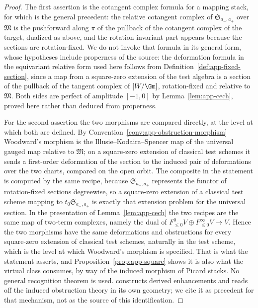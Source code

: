 \begin{proof}
The first assertion is the cotangent complex formula for a mapping stack, for
which \cite{ToenVezzosiHAGII} is the general precedent: the
relative cotangent complex of \(\mathfrak S_{a_-,a_+}\) over \(\mathfrak M\) is
the pushforward along \(\pi\) of the pullback of the cotangent complex of the
target, dualized as above, and the rotation-invariant part appears because the
sections are rotation-fixed.  We do not invoke that formula in its general
form, whose hypotheses include properness of the source: the deformation
formula in the equivariant relative form used here follows from
Definition~\ref{def:app-fixed-section}, since a map from a square-zero
extension of the test algebra is a section of the pullback of the tangent
complex of \([W/\Gm]\), rotation-fixed and relative to \(\mathfrak M\).
Both sides are perfect of amplitude
\([-1,0]\) by Lemma~\ref{lem:app-cech}, proved here rather than deduced from
properness.

For the second assertion the two morphisms are compared directly, at the level
at which both are defined.  By
Convention~\ref{conv:app-obstruction-morphism} Woodward's morphism is the
Illusie--Kodaira--Spencer map of the universal gauged map relative to
\(\mathfrak M\); on a square-zero extension of classical test schemes it sends
a first-order deformation of the section to the induced pair of deformations
over the two charts, compared on the open orbit.  The composite in the
statement is computed by the same recipe, because
\(\mathfrak S_{a_-,a_+}\) represents the functor of rotation-fixed sections
degreewise, so a square-zero extension of a classical test scheme mapping to
\(t_0\mathfrak S_{a_-,a_+}\) is exactly that extension problem for the
universal section.  In the presentation of Lemma~\ref{lem:app-cech} the two
recipes are the same map of two-term complexes, namely the dual of
\(F^0_{\leq0}V\oplus F^\infty_{\leq0}V\to V\).  Hence the two morphisms have
the same deformations and obstructions for every square-zero extension of
classical test schemes, naturally in the test scheme, which is the level at
which Woodward's morphism is specified.  That is what the statement asserts,
and Proposition~\ref{prop:app-square} shows it is also what the virtual class
consumes, by way of the induced morphism of Picard stacks.  No general
recognition theorem is used.  \cite{SchurgToenVezzosi} constructs
derived enhancements and reads off the induced obstruction theory in its own
geometry; we cite it as precedent for that mechanism, not as the source of
this identification.
\end{proof}

